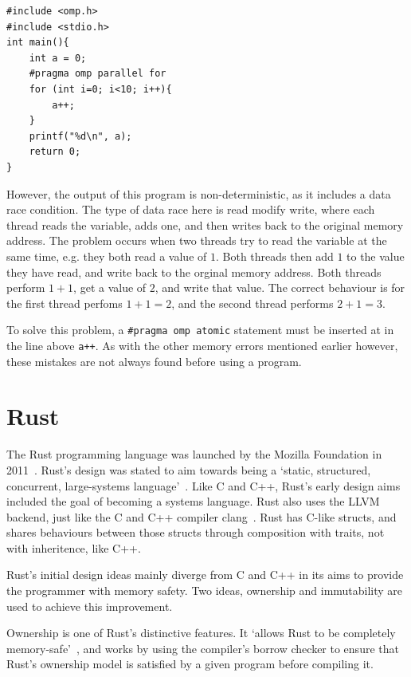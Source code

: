 \begin{code}
\begin{verbatim}
#include <omp.h>
#include <stdio.h>
int main(){
    int a = 0;
    #pragma omp parallel for
    for (int i=0; i<10; i++){
        a++;
    }
    printf("%d\n", a);
    return 0;
}
\end{verbatim}
\label{lst:omp-eg}
\end{code}

However, the output of this program is non-deterministic, as it includes a data race condition. The type of data race here is read modify write, where each thread reads the variable, adds one, and then writes back to the original memory address.
The problem occurs when two threads try to read the variable at the same time, e.g. they both read a value of $1$. Both threads then add $1$ to the value they have read, and write back to the orginal memory address. 
Both threads perform $1+1$, get a value of $2$, and write that value. The correct behaviour is for the first thread perfoms $1+1=2$, and the second thread performs $2+1=3$.

To solve this problem, a \texttt{\#pragma omp atomic} statement must be inserted at in the line above \texttt{a++}. As with the other memory errors mentioned earlier however, these mistakes are not always found before using a program.

\section{Rust}\label{sec:rust}
The Rust programming language was launched by the Mozilla Foundation in 2011~\cite{FutureTense}. Rust's design was stated to aim towards being a `static, structured, concurrent, large-systems language'~\cite{pServo}. Like C and C++, Rust's early design aims included the goal of becoming a systems language.
Rust also uses the LLVM backend, just like the C and C++ compiler clang~\cite{rustClang}.
Rust has C-like structs, and shares behaviours between those structs through composition with traits, not with inheritence, like C++.

Rust's initial design ideas mainly diverge from C and C++ in its aims to provide the programmer with memory safety. Two ideas, ownership and immutability are used to achieve this improvement. 

Ownership is one of Rust's distinctive features. It `allows Rust to be completely memory-safe'~\cite{NomOwner}, and works by using the compiler's borrow checker to ensure that Rust's ownership model is satisfied by a given program before compiling it.

